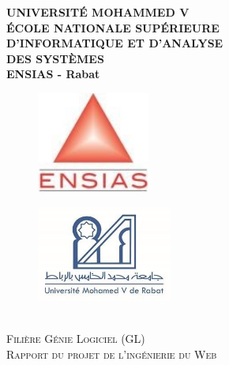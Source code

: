 \documentclass{article}
\begin{document}
\begin{titlepage}
\newcommand{\HRule}{\rule{\linewidth}{0.5mm}} %
\setlength{\topmargin}{0in}
\center %
 \begin{center}
\textbf{{UNIVERSITÉ MOHAMMED V }\\ {ÉCOLE NATIONALE SUPÉRIEURE }\\{D'INFORMATIQUE ET D'ANALYSE \\DES SYSTÈMES}\\
{ENSIAS - Rabat}}
\begin{figure}[!h]
\vspace{- 3.3 cm}
\hspace{ 0 cm}
\includegraphics[width=10em]{logo_ensias.jpg}
\end{figure}
\begin{figure}[!h]
\vspace{- 4.8cm}
\hspace{13 cm}
\includegraphics[width=12em]{um5_logo.jpg}
\end{figure}
\end{center}\\[2cm]

\textsc{\Large Filière Génie Logiciel (GL) }\\[0.5cm] %
\LARGE \textsc{Rapport du projet de l'ingénierie du Web
} \\[1.5cm] 
\textsc{\large }\\[0.5cm] %



\end{titlepage}
\end{document}
